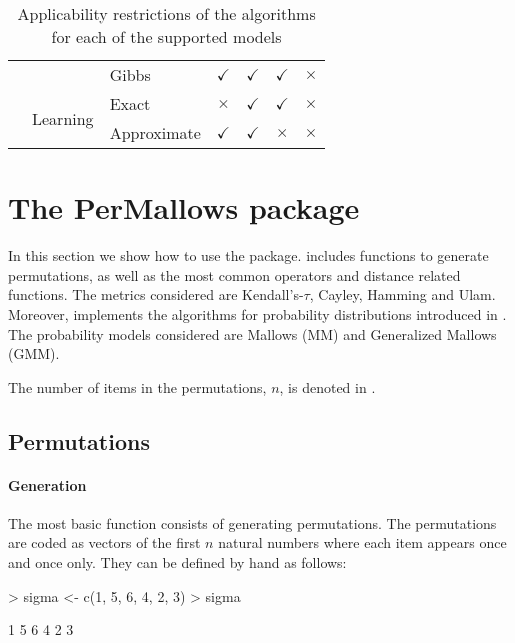 \documentclass[article,nojss]{jss}
\begin{document}
\begin{table}[h]
\begin{tabular}{lllcccc}
                     &                           	& Gibbs       	& $\checkmark$                	& $\checkmark$               & $\checkmark$                	&$\times$           \\
                      \cline{2-7}
                      & \multirow{2}{*}{Learning} 
                      				& Exact      	&$\times$                   		& $\checkmark$               & $\checkmark$                	&$\times$            \\
                     &                           	& Approximate & $\checkmark$                	& $\checkmark$               & $\times$                	&$\times$          \\
\hline \hline
\end{tabular}
\caption{Applicability restrictions of the algorithms for each of the supported models}
\label{tab:restrictions}
\end{table}



\section{The PerMallows package}
\label{sec:usage}





In this section we show how to use the  package.  includes functions to generate permutations, as well as the most common operators and distance related functions. The metrics considered are Kendall's-$\tau$, Cayley, Hamming and Ulam. Moreover,  implements the algorithms for probability distributions introduced in \cite{Irurozki2014,Irurozki2014a,Irurozki2014b}. The probability models considered are Mallows (MM) and Generalized Mallows (GMM).

The number of items in the permutations, $n$, is denoted  in .

\subsection{Permutations}
\paragraph{Generation}
The most basic function consists of generating permutations. The permutations are coded as vectors of the first $n$ natural numbers where each item appears once and once only. They can be defined by hand as follows:
\begin{Schunk}
\begin{Sinput}
> sigma <- c(1, 5, 6, 4, 2, 3)
> sigma
\end{Sinput}
\begin{Soutput}
[1] 1 5 6 4 2 3
\end{Soutput}
\end{Schunk}
\end{document}
